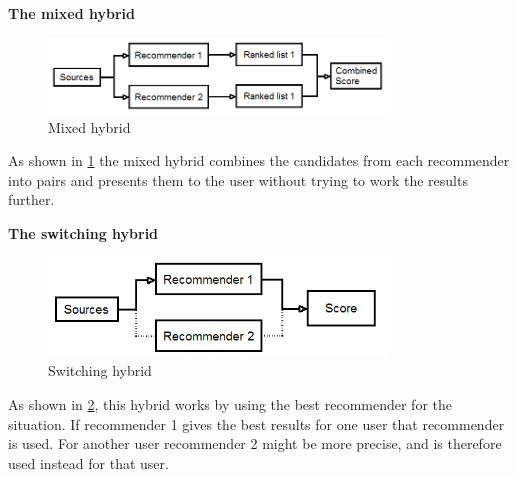 \textbf{The mixed hybrid}
\begin{figure}[H]
\centering
\includegraphics[width=0.8\textwidth]{Images/Mixed hybrid.png}
\caption{Mixed hybrid}
\label{Mixed}
\end{figure}
As shown in \ref{Mixed} the mixed hybrid combines the candidates from each recommender into pairs and presents them to the user without trying to work the results further.

\textbf{The switching hybrid}
\begin{figure}[H]
\centering
\includegraphics[width=0.8\textwidth]{Images/Switching hybrid.png}
\caption{Switching hybrid}
\label{Switching}
\end{figure}
As shown in \ref{Switching}, this hybrid works by using the best recommender for the situation. If recommender 1 gives the best results for one user that recommender is used. For another user recommender 2 might be more precise, and is therefore used instead for that user.
